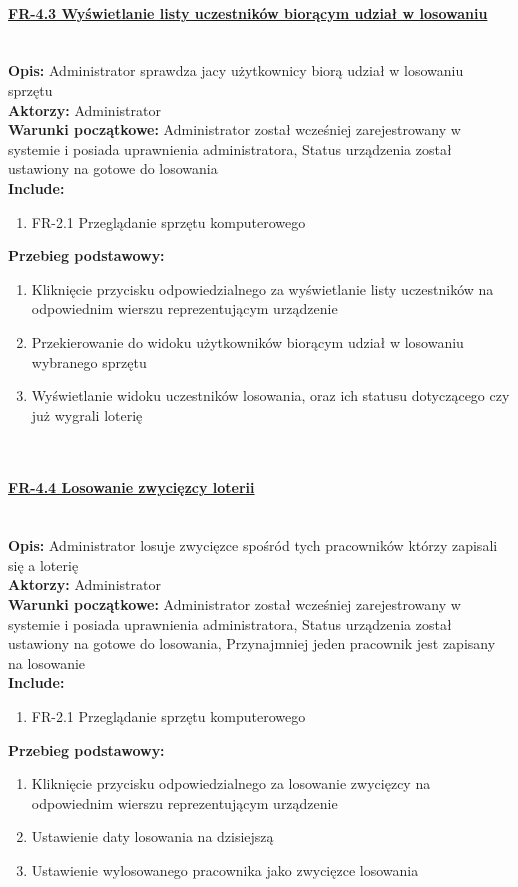 \paragraph{\underline{FR-4.3 Wyświetlanie listy uczestników biorącym udział w losowaniu}}\mbox{}\\[1mm]
	\noindent\textbf{Opis:} Administrator sprawdza jacy użytkownicy biorą udział w losowaniu sprzętu\\
	\noindent\textbf{Aktorzy:} Administrator\\
	\textbf{Warunki początkowe:} Administrator został wcześniej zarejestrowany w systemie i posiada uprawnienia administratora, Status urządzenia został ustawiony na gotowe do losowania\\
	\textbf{Include:} 
	\begin{enumerate}[noparskip]
		\item FR-2.1 Przeglądanie sprzętu komputerowego
	\end{enumerate}
  \textbf{Przebieg podstawowy:}
	\begin{enumerate}[noparskip]
		\item Kliknięcie przycisku odpowiedzialnego za wyświetlanie listy uczestników na odpowiednim wierszu reprezentującym urządzenie
		\item Przekierowanie do widoku użytkowników biorącym udział w losowaniu wybranego sprzętu
		\item Wyświetlanie widoku uczestników losowania, oraz ich statusu dotyczącego czy już wygrali loterię
  \end{enumerate} \mbox{}\\[-11mm]

\paragraph{\underline{FR-4.4 Losowanie zwycięzcy loterii}}\mbox{}\\[1mm]
	\noindent\textbf{Opis:} Administrator losuje zwycięzce spośród tych pracowników którzy zapisali się a loterię\\
	\noindent\textbf{Aktorzy:} Administrator\\
	\textbf{Warunki początkowe:} Administrator został wcześniej zarejestrowany w systemie i posiada uprawnienia administratora, Status urządzenia został ustawiony na gotowe do losowania, Przynajmniej jeden pracownik jest zapisany na losowanie\\
	\textbf{Include:} 
	\begin{enumerate}[noparskip]
		\item FR-2.1 Przeglądanie sprzętu komputerowego
	\end{enumerate}
  \textbf{Przebieg podstawowy:}
	\begin{enumerate}[noparskip]
		\item Kliknięcie przycisku odpowiedzialnego za losowanie zwycięzcy na odpowiednim wierszu reprezentującym urządzenie
		\item Ustawienie daty losowania na dzisiejszą
		\item Ustawienie wylosowanego pracownika jako zwycięzce losowania 
  \end{enumerate} \mbox{}\\[-11mm]

